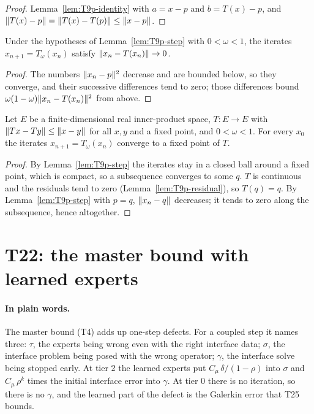 \begin{proof}
  \leanok
  Lemma~\ref{lem:T9p-identity} with $a=x-p$ and $b=T(x)-p$, and
  $\lVert T(x)-p\rVert=\lVert T(x)-T(p)\rVert\le\lVert x-p\rVert$.
\end{proof}

\begin{lemma}\label{lem:T9p-residual}
  \leanok
  Under the hypotheses of Lemma~\ref{lem:T9p-step} with $0<\omega<1$, the
  iterates $x_{n+1}=T_\omega(x_n)$ satisfy $\lVert x_n-T(x_n)\rVert\to0$.
\end{lemma}

\begin{proof}
  \leanok
  The numbers $\lVert x_n-p\rVert^2$ decrease and are bounded below, so they
  converge, and their successive differences tend to zero; those differences
  bound $\omega(1-\omega)\lVert x_n-T(x_n)\rVert^2$ from above.
\end{proof}

\begin{theorem}\label{thm:T9p}
  \leanok
  Let $E$ be a finite-dimensional real inner-product space, $T:E\to E$ with
  $\lVert Tx-Ty\rVert\le\lVert x-y\rVert$ for all $x,y$ and a fixed point, and
  $0<\omega<1$.  For every $x_0$ the iterates $x_{n+1}=T_\omega(x_n)$ converge
  to a fixed point of $T$.
\end{theorem}

\begin{proof}
  \leanok
  By Lemma~\ref{lem:T9p-step} the iterates stay in a closed ball around a
  fixed point, which is compact, so a subsequence converges to some $q$.  $T$
  is continuous and the residuals tend to zero
  (Lemma~\ref{lem:T9p-residual}), so $T(q)=q$.  By
  Lemma~\ref{lem:T9p-step} with $p=q$, $\lVert x_n-q\rVert$ decreases; it tends to
  zero along the subsequence, hence altogether.
\end{proof}

\section{T22: the master bound with learned experts}

\paragraph{In plain words.}
The master bound (T4) adds up one-step defects.  For a coupled step it names
three: $\tau$, the experts being wrong even with the right interface data;
$\sigma$, the interface problem being posed with the wrong operator; $\gamma$,
the interface solve being stopped early.  At tier 2 the learned experts put
$C_\mu\,\delta/(1-\rho)$ into $\sigma$ and $C_\mu\,\rho^k$ times the initial
interface error into $\gamma$.  At tier 0 there is no iteration, so there is no
$\gamma$, and the learned part of the defect is the Galerkin error that T25
bounds.

